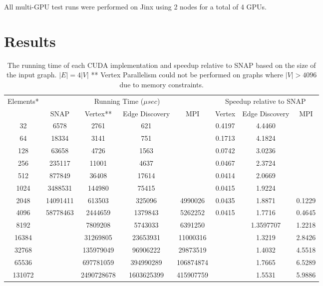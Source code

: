 \documentclass[10pt,twocolumn]{article}
\begin{document}
All multi-GPU test runs were performed on Jinx using 2 nodes for a total of 4 GPUs.

\section{Results}

\begin{table*}[h]
\centering
\label{tbl:compare}
\begin{tabular}{|c|c|c|c|c|c|c|c|}
\hline
\multirow{2}{*}{Elements*}& \multicolumn{4}{c|}{Running Time ($\mu sec$)} & \multicolumn{3}{c|}{Speedup relative to SNAP}\\\cline{2-8}
&SNAP&Vertex**&Edge Discovery&MPI&Vertex&Edge Discovery&MPI\\\hline
32 & 6578 & 2761 & 621 &  & 0.4197 & 4.4460 & \\\hline
64 & 18334 & 3141 & 751 &  & 0.1713 & 4.1824 & \\\hline
128 & 63658 & 4726 & 1563 &  & 0.0742 & 3.0236 & \\\hline
256 & 235117 & 11001 & 4637 &  & 0.0467 & 2.3724 & \\\hline
512 & 877849 & 36408 & 17614 &  & 0.0414 & 2.0669 & \\\hline
1024 & 3488531 & 144980 & 75415 &  & 0.0415 & 1.9224 & \\\hline
2048 & 14091411 & 613503 & 325096 & 4990026 & 0.0435 & 1.8871 & 0.1229\\\hline
4096 & 58778463 & 2444659 & 1379843 & 5262252 & 0.0415 & 1.7716 & 0.4645\\\hline
8192 &  & 7809208 & 5743033 & 6391250 &  & 1.3597707 & 1.2218\\\hline
16384 &  & 31269805 & 23653931 & 11000316 &  & 1.3219 & 2.8426\\\hline
32768 &  & 135979049 & 96906222 & 29873519 &  & 1.4032 & 4.5518\\\hline
65536 &  & 697781059 & 394990289 & 106874874 &  & 1.7665 & 6.5289\\\hline
131072 &  & 2490728678 & 1603625399 & 415907759 &  & 1.5531 & 5.9886\\\hline
\end{tabular}
\caption{The running time of each CUDA implementation and speedup relative to SNAP based on the size of the input graph.\newline
{\scriptsize *$|E| = 4|V|$ \newline
** Vertex Parallelism could not be performed on graphs where $|V|>4096$ due to memory constraints.}
}
\end{table*}
\end{document}
